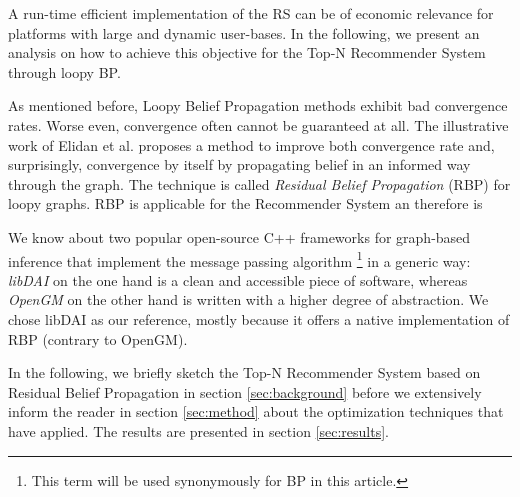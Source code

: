 A run-time efficient implementation of the RS can be of economic relevance for platforms with large and dynamic user-bases. In the following, we present an analysis on how to achieve this objective for the Top-N Recommender System through loopy BP.

As mentioned before, Loopy Belief Propagation methods exhibit bad convergence rates. Worse even, convergence often cannot be guaranteed at all. The illustrative work of Elidan et al. \cite{elidan2012residual} proposes a method to improve both convergence rate and, surprisingly, convergence by itself by propagating belief in an informed way through the graph. The technique is called \textit{Residual Belief Propagation} (RBP) for loopy graphs. RBP is applicable for the Recommender System an therefore is 

We know about two popular open-source C++ frameworks for graph-based inference that implement the message passing algorithm \footnote{This term will be used synonymously for BP in this article.} in a generic way: \textit{libDAI} \cite{Mooij_libDAI_10} on the one hand is a clean and accessible piece of software, whereas \textit{OpenGM} \cite{andres2012opengm} on the other hand is written with a higher degree of abstraction. We chose libDAI as our reference, mostly because it offers a native implementation of RBP (contrary to OpenGM).

In the following, we briefly sketch the Top-N Recommender System based on Residual Belief Propagation in section \ref{sec:background} before we extensively inform the reader in section \ref{sec:method} about the optimization techniques that have applied. The results are presented in section \ref{sec:results}.